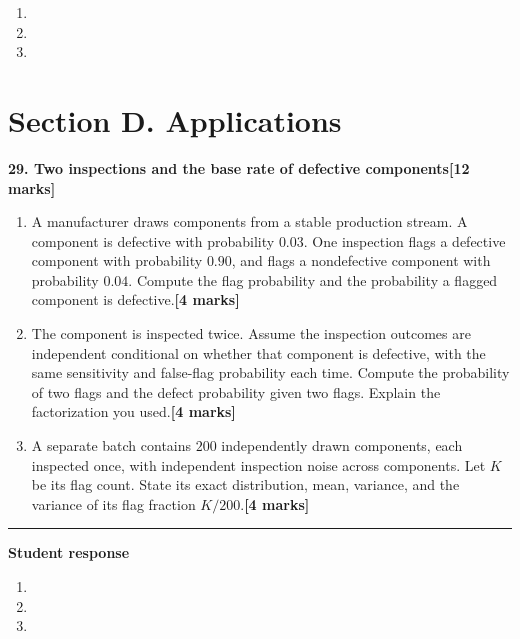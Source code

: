 \documentclass[11pt,a4paper]{article}
\newlength{\BlankAnswerHeight}\setlength{\BlankAnswerHeight}{16mm}
\newcommand{\AnswerBlank}{\leavevmode\par\vspace{\BlankAnswerHeight}}
\begin{document}
\begin{enumerate}[label=(\alph*),leftmargin=8mm,itemsep=3pt]
\item
\AnswerBlank
\item
\AnswerBlank
\item
\AnswerBlank
\end{enumerate}
\newpage\section*{Section D. Applications}
\textbf{29. Two inspections and the base rate of defective components}\hfill\textbf{[12 marks]}\par\medskip
\begin{enumerate}[label=(\alph*),leftmargin=8mm,itemsep=3pt]
\item A manufacturer draws components from a stable production stream. A component is defective with probability \(0.03\). One inspection flags a defective component with probability \(0.90\), and flags a nondefective component with probability \(0.04\). Compute the flag probability and the probability a flagged component is defective.\hfill\textbf{[4 marks]}
\item The component is inspected twice. Assume the inspection outcomes are independent conditional on whether that component is defective, with the same sensitivity and false-flag probability each time. Compute the probability of two flags and the defect probability given two flags. Explain the factorization you used.\hfill\textbf{[4 marks]}
\item A separate batch contains \(200\) independently drawn components, each inspected once, with independent inspection noise across components. Let \(K\) be its flag count. State its exact distribution, mean, variance, and the variance of its flag fraction \(K/200\).\hfill\textbf{[4 marks]}
\end{enumerate}\par\medskip\hrule\medskip\textbf{Student response}\par
\begin{enumerate}[label=(\alph*),leftmargin=8mm,itemsep=3pt]
\item
\AnswerBlank
\item
\AnswerBlank
\item
\AnswerBlank
\end{enumerate}
\end{document}
